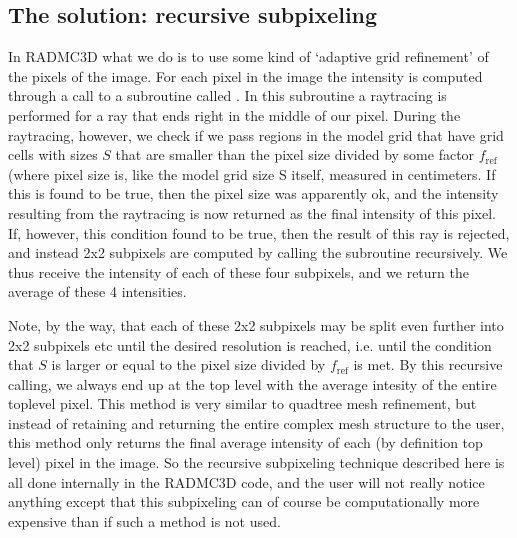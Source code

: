 \documentclass[letterpaper,10pt,english]{sphinxmanual}
\begin{document}
\subsection{The solution: recursive sub\sphinxhyphen{}pixeling}
\label{\detokenize{imagesspectra:the-solution-recursive-sub-pixeling}}\label{\detokenize{imagesspectra:sec-recursive-subpixeling}}
In RADMC\sphinxhyphen{}3D what we do is to use some kind of ‘adaptive grid refinement’ of the
pixels of the image. For each pixel in the image the intensity is computed
through a call to a subroutine called . In this
subroutine a ray\sphinxhyphen{}tracing is performed for a ray that ends right in the middle of
our pixel. During the ray\sphinxhyphen{}tracing, however, we check if we pass regions in the
model grid that have grid cells with sizes \(S\) that are smaller than the
pixel size divided by some factor \(f_{\mathrm{ref}}\) (where pixel size is,
like the model grid size S itself, measured in centimeters. If this is found
 to be true, then the pixel size was apparently ok, and the intensity
resulting from the ray\sphinxhyphen{}tracing is now returned as the final intensity of this
pixel. If, however, this condition  found to be true, then the result of
this ray is rejected, and instead 2x2 sub\sphinxhyphen{}pixels are computed by calling the
 subroutine recursively. We thus receive the
intensity of each of these four sub\sphinxhyphen{}pixels, and we return the average of these 4
intensities.

Note, by the way, that each of these 2x2 subpixels may be split even further
into 2x2 sub\sphinxhyphen{}pixels etc until the desired resolution is reached, i.e. until
the condition that \(S\) is larger or equal to the pixel size divided by
\(f_{\mathrm{ref}}\) is met. By this recursive calling, we always end up at
the top level with the average intesity of the entire top\sphinxhyphen{}level pixel.  This
method is very similar to quad\sphinxhyphen{}tree mesh refinement, but instead of
retaining and returning the entire complex mesh structure to the user, this
method only returns the final average intensity of each (by definition top
level) pixel in the image. So the recursive sub\sphinxhyphen{}pixeling technique described
here is all done internally in the RADMC\sphinxhyphen{}3D code, and the user will not
really notice anything except that this sub\sphinxhyphen{}pixeling can of course be
computationally more expensive than if such a method is not used.
\end{document}
